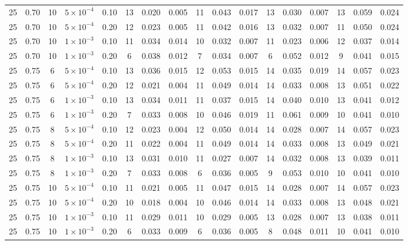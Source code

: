 \begin{longtable}{c c c c c c c c c c c c c c c c c }
25 & 0.70 & 10 & $5{\times}10^{-4}$ & 0.10 & 13 & 0.020 & 0.005 & 11 & 0.043 & 0.017 & 13 & 0.030 & 0.007 & 13 & 0.059 & 0.024 \\
25 & 0.70 & 10 & $5{\times}10^{-4}$ & 0.20 & 12 & 0.023 & 0.005 & 11 & 0.042 & 0.016 & 13 & 0.032 & 0.007 & 11 & 0.050 & 0.024 \\
25 & 0.70 & 10 & $1{\times}10^{-3}$ & 0.10 & 11 & 0.034 & 0.014 & 10 & 0.032 & 0.007 & 11 & 0.023 & 0.006 & 12 & 0.037 & 0.014 \\
25 & 0.70 & 10 & $1{\times}10^{-3}$ & 0.20 & 6 & 0.038 & 0.012 & 7 & 0.034 & 0.007 & 6 & 0.052 & 0.012 & 9 & 0.041 & 0.015 \\
25 & 0.75 & 6 & $5{\times}10^{-4}$ & 0.10 & 13 & 0.036 & 0.015 & 12 & 0.053 & 0.015 & 14 & 0.035 & 0.019 & 14 & 0.057 & 0.023 \\
25 & 0.75 & 6 & $5{\times}10^{-4}$ & 0.20 & 12 & 0.021 & 0.004 & 11 & 0.049 & 0.014 & 14 & 0.033 & 0.008 & 13 & 0.051 & 0.022 \\
25 & 0.75 & 6 & $1{\times}10^{-3}$ & 0.10 & 13 & 0.034 & 0.011 & 11 & 0.037 & 0.015 & 14 & 0.040 & 0.010 & 13 & 0.041 & 0.012 \\
25 & 0.75 & 6 & $1{\times}10^{-3}$ & 0.20 & 7 & 0.033 & 0.008 & 10 & 0.046 & 0.019 & 11 & 0.061 & 0.009 & 10 & 0.041 & 0.010 \\
25 & 0.75 & 8 & $5{\times}10^{-4}$ & 0.10 & 12 & 0.023 & 0.004 & 12 & 0.050 & 0.014 & 14 & 0.028 & 0.007 & 14 & 0.057 & 0.023 \\
25 & 0.75 & 8 & $5{\times}10^{-4}$ & 0.20 & 11 & 0.022 & 0.004 & 11 & 0.049 & 0.014 & 14 & 0.033 & 0.008 & 13 & 0.049 & 0.021 \\
25 & 0.75 & 8 & $1{\times}10^{-3}$ & 0.10 & 13 & 0.031 & 0.010 & 11 & 0.027 & 0.007 & 14 & 0.032 & 0.008 & 13 & 0.039 & 0.011 \\
25 & 0.75 & 8 & $1{\times}10^{-3}$ & 0.20 & 7 & 0.033 & 0.008 & 6 & 0.036 & 0.005 & 9 & 0.053 & 0.010 & 10 & 0.041 & 0.010 \\
25 & 0.75 & 10 & $5{\times}10^{-4}$ & 0.10 & 11 & 0.021 & 0.005 & 11 & 0.047 & 0.015 & 14 & 0.028 & 0.007 & 14 & 0.057 & 0.023 \\
25 & 0.75 & 10 & $5{\times}10^{-4}$ & 0.20 & 10 & 0.018 & 0.004 & 10 & 0.046 & 0.014 & 14 & 0.033 & 0.008 & 13 & 0.048 & 0.021 \\
25 & 0.75 & 10 & $1{\times}10^{-3}$ & 0.10 & 11 & 0.029 & 0.011 & 10 & 0.029 & 0.005 & 13 & 0.028 & 0.007 & 13 & 0.038 & 0.011 \\
25 & 0.75 & 10 & $1{\times}10^{-3}$ & 0.20 & 6 & 0.033 & 0.009 & 6 & 0.036 & 0.005 & 8 & 0.048 & 0.011 & 10 & 0.041 & 0.010 \\

\end{longtable}
